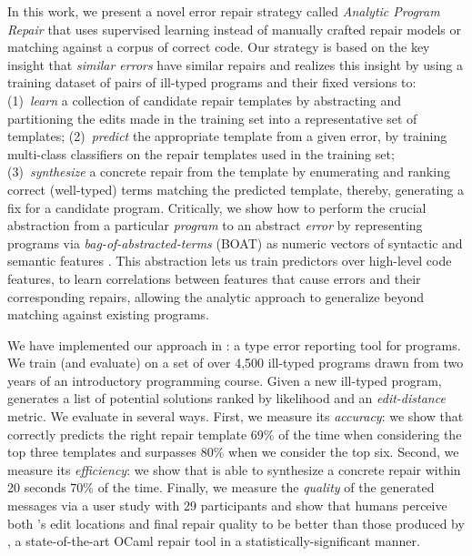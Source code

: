%
In this work, we present a novel error repair strategy called \emph{Analytic
Program Repair} that uses supervised learning instead of manually crafted repair
models or matching against a corpus of correct code.
%
Our strategy is based on the key insight that \emph{similar errors} have similar
repairs and realizes this insight by using a training dataset of pairs of
ill-typed programs and their fixed versions to:
%
(1)~\emph{learn} a collection of candidate repair templates
    by abstracting and partitioning the edits made in the
    training set into a representative set of templates;
%
(2)~\emph{predict} the appropriate template from a given error,
    by training multi-class classifiers on the repair templates
    used in the training set;
%
(3)~\emph{synthesize} a concrete repair from the template
   by enumerating and ranking correct (\eg well-typed)
   terms matching the predicted template,
%
thereby, generating a fix for a candidate program.
%
Critically, we show how to perform the crucial abstraction
from a particular \emph{program} to an abstract \emph{error}
by representing programs via \emph{bag-of-abstracted-terms} (BOAT)
\ie as numeric vectors of syntactic and semantic features \citep{Seidel2017-ko}.
%
This abstraction lets us train predictors over high-level
code features, \ie to learn correlations between features
that cause errors and their corresponding repairs, allowing
the analytic approach to generalize beyond matching against
existing programs.

\mypara{\toolname}
%
We have implemented our approach in \toolname: a type error reporting
tool for \ocaml programs. We train (and evaluate) \toolname on a set of
over 4,500 ill-typed \ocaml programs drawn from two years of an
introductory programming course.
%
Given a new ill-typed program, \toolname generates a list of potential
solutions ranked by likelihood and an \emph{edit-distance} metric.
%
We evaluate \toolname in several ways.
%
First, we measure its \emph{accuracy}: we show that \toolname correctly predicts
the right repair template 69\% of the time when considering the top three
templates and surpasses 80\% when we consider the top six.
%
Second, we measure its \emph{efficiency}: we show that \toolname is able to
synthesize a concrete repair within 20 seconds 70\% of the time.
%
Finally, we measure the \emph{quality} of the generated messages via a user
study with 29 participants and show that humans perceive both \toolname's edit
locations and final repair quality to be better than those produced by \seminal,
a state-of-the-art OCaml repair tool \citep{Lerner2007-dt} in a
statistically-significant manner.


